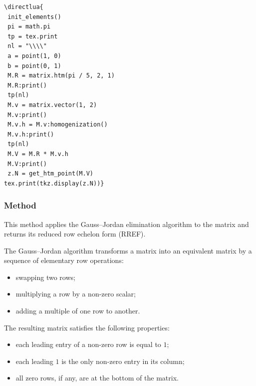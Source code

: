 \vspace{.5 em}
\begin{minipage}{.5\textwidth}
\begin{verbatim}
\directlua{
 init_elements()
 pi = math.pi
 tp = tex.print
 nl = "\\\\"
 a = point(1, 0)
 b = point(0, 1)
 M.R = matrix.htm(pi / 5, 2, 1)
 M.R:print()
 tp(nl)
 M.v = matrix.vector(1, 2)
 M.v:print()
 M.v.h = M.v:homogenization()
 M.v.h:print()
 tp(nl)
 M.V = M.R * M.v.h
 M.V:print()
 z.N = get_htm_point(M.V)
tex.print(tkz.display(z.N))}
\end{verbatim}
\end{minipage}
\begin{minipage}{.5\textwidth}
\end{minipage}

\subsubsection{Method }
\label{ssub:method_matrix_gauss_jordan}


This method applies the Gauss–Jordan elimination algorithm to the matrix and returns its reduced row echelon form (RREF).

\medskip
The Gauss–Jordan algorithm transforms a matrix into an equivalent matrix by a sequence of elementary row operations:
\begin{itemize}
\item swapping two rows;
\item multiplying a row by a non-zero scalar;
\item adding a multiple of one row to another.
\end{itemize}
The resulting matrix satisfies the following properties:
\begin{itemize}
\item each leading entry of a non-zero row is equal to $1$;
\item each leading $1$ is the only non-zero entry in its column;
\item all zero rows, if any, are at the bottom of the matrix.
\end{itemize}

